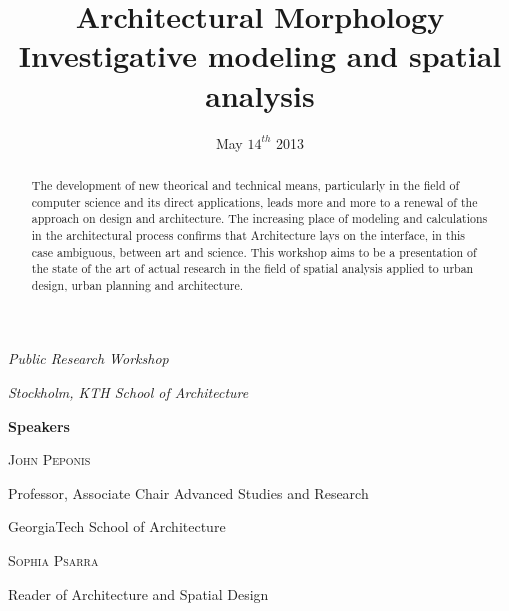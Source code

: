 \documentclass[english]{article}
\date{May $14^{th}$ 2013}
\newcommand{\noun}[1]{\textsc{#1}}
\begin{document}
\title{Architectural Morphology\\
Investigative modeling and spatial analysis}

\maketitle
\bigskip{}
\bigskip{}
\bigskip{}


\textit{\large \hfill{}Public Research Workshop\hfill{}\hfill{}}{\large \par}

\textit{\large \hfill{}Stockholm, KTH School of Architecture\hfill{}\hfill{}}{\large \par}

\bigskip{}
\bigskip{}
\bigskip{}
\bigskip{}

\begin{abstract}
The development of new theorical and technical means, particularly
in the field of computer science and its direct applications, leads
more and more to a renewal of the approach on design and architecture.
The increasing place of modeling and calculations in the architectural
process confirms that Architecture lays on the interface, in this
case ambiguous, between art and science. This workshop aims to be
a presentation of the state of the art of actual research in the field
of spatial analysis applied to urban design, urban planning and architecture.
\end{abstract}
\newpage{}

\textit{\large \hfill{}}\textbf{\Large Speakers}\textit{\large \hfill{}\hfill{}}{\large \par}

\bigskip{}
\bigskip{}


\textit{\large \hfill{}}\noun{John Peponis}\textit{\large \hfill{}\hfill{}}{\large \par}

\textit{\large \hfill{}}Professor, Associate Chair Advanced Studies
and Research\textit{\large \hfill{}\hfill{}}{\large \par}

\textit{\large \hfill{}}GeorgiaTech School of Architecture\textit{\large \hfill{}\hfill{}}{\large \par}

\bigskip{}


\textit{\large \hfill{}}\noun{Sophia Psarra}\textit{\large \hfill{}\hfill{}}{\large \par}

\textit{\large \hfill{}}Reader of Architecture and Spatial Design\textit{\large \hfill{}\hfill{}}{\large \par}
\end{document}

